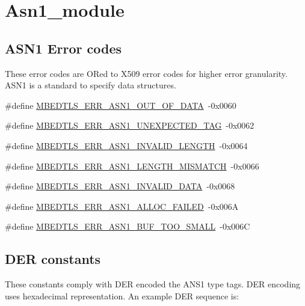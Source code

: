 \hypertarget{group__asn1__module}{}\section{Asn1\+\_\+module}
\label{group__asn1__module}
\subsection*{A\+S\+N1 Error codes}
\label{_amgrp91652e79e1691c582917ccf754f9d814}%
These error codes are OR\textquotesingle{}ed to X509 error codes for higher error granularity. A\+S\+N1 is a standard to specify data structures. \begin{DoxyCompactItemize}
\item 
\#define \mbox{\hyperlink{group__asn1__module_ga284c12cf03a4ffeee89a63750f00dfdd}{M\+B\+E\+D\+T\+L\+S\+\_\+\+E\+R\+R\+\_\+\+A\+S\+N1\+\_\+\+O\+U\+T\+\_\+\+O\+F\+\_\+\+D\+A\+TA}}~-\/0x0060
\item 
\#define \mbox{\hyperlink{group__asn1__module_gab055945fda47ad0e16dc59f8c5ecb86e}{M\+B\+E\+D\+T\+L\+S\+\_\+\+E\+R\+R\+\_\+\+A\+S\+N1\+\_\+\+U\+N\+E\+X\+P\+E\+C\+T\+E\+D\+\_\+\+T\+AG}}~-\/0x0062
\item 
\#define \mbox{\hyperlink{group__asn1__module_ga0ebe8e0a4894533db505303504eea59b}{M\+B\+E\+D\+T\+L\+S\+\_\+\+E\+R\+R\+\_\+\+A\+S\+N1\+\_\+\+I\+N\+V\+A\+L\+I\+D\+\_\+\+L\+E\+N\+G\+TH}}~-\/0x0064
\item 
\#define \mbox{\hyperlink{group__asn1__module_gacf6fad8d80fa050c3463539412674a20}{M\+B\+E\+D\+T\+L\+S\+\_\+\+E\+R\+R\+\_\+\+A\+S\+N1\+\_\+\+L\+E\+N\+G\+T\+H\+\_\+\+M\+I\+S\+M\+A\+T\+CH}}~-\/0x0066
\item 
\#define \mbox{\hyperlink{group__asn1__module_ga9ac36bf8c63a9968afe1d35d0569e4d8}{M\+B\+E\+D\+T\+L\+S\+\_\+\+E\+R\+R\+\_\+\+A\+S\+N1\+\_\+\+I\+N\+V\+A\+L\+I\+D\+\_\+\+D\+A\+TA}}~-\/0x0068
\item 
\#define \mbox{\hyperlink{group__asn1__module_gab7d40360e48e414ffa1a4df1961723d2}{M\+B\+E\+D\+T\+L\+S\+\_\+\+E\+R\+R\+\_\+\+A\+S\+N1\+\_\+\+A\+L\+L\+O\+C\+\_\+\+F\+A\+I\+L\+ED}}~-\/0x006A
\item 
\#define \mbox{\hyperlink{group__asn1__module_gaf9bf64017ed866c846b506e80dc15e94}{M\+B\+E\+D\+T\+L\+S\+\_\+\+E\+R\+R\+\_\+\+A\+S\+N1\+\_\+\+B\+U\+F\+\_\+\+T\+O\+O\+\_\+\+S\+M\+A\+LL}}~-\/0x006C
\end{DoxyCompactItemize}
\subsection*{D\+ER constants}
\label{_amgrpeab69e4214cba23802e5f50d9da845b8}%
These constants comply with D\+ER encoded the A\+N\+S1 type tags. D\+ER encoding uses hexadecimal representation. An example D\+ER sequence is\+:~\newline

